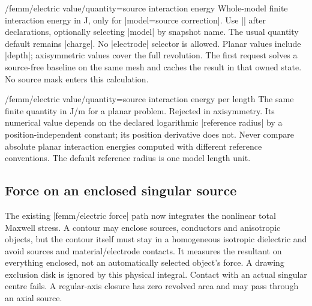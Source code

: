 \begin{key}{/femm/electric value/quantity=source interaction energy}
Whole-model finite interaction energy in J, only for |model=source correction|.
Use |\femmelectricvalue| after declarations, optionally selecting |model| by
snapshot name. The usual quantity default remains |charge|. No |electrode|
selector is allowed. Planar values include |depth|; axisymmetric values cover
the full revolution. The first request solves a source-free baseline on the
same mesh and caches the result in that owned state. No source mask enters
this calculation.
\end{key}
\begin{key}{/femm/electric value/quantity=source interaction energy per length}
The same finite quantity in J/m for a planar problem. Rejected in axisymmetry.
Its numerical value depends on the declared logarithmic |reference radius|
by a position-independent constant; its position derivative does not.
Never compare absolute planar interaction energies computed with different
reference conventions. The default reference radius is one model length unit.
\end{key}

\subsection{Force on an enclosed singular source}
\label{sec:electric-source-force}
The existing |femm/electric force| path now integrates the nonlinear total
Maxwell stress. A contour may enclose sources, conductors and anisotropic
objects, but the contour itself must stay in a homogeneous isotropic dielectric
and avoid sources and material/electrode contacts. It measures the resultant
on everything enclosed, not an automatically selected object's force.
A drawing exclusion disk is ignored by this physical integral. Contact with
an actual singular centre fails. A regular-axis closure has zero revolved
area and may pass through an axial source.

